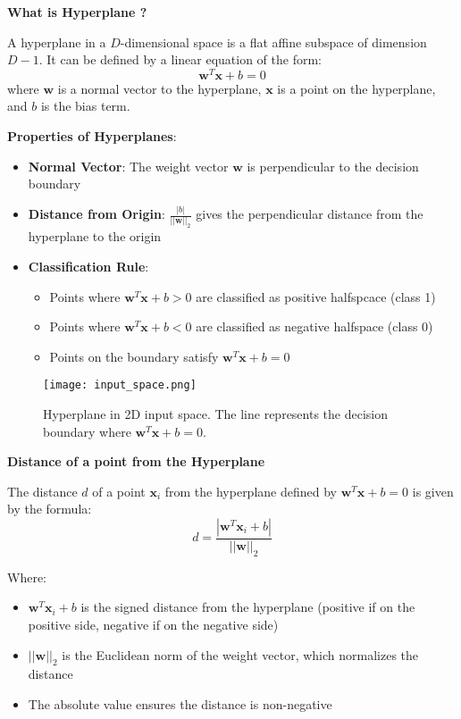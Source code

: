 \textbf{What is Hyperplane ?} 
\begin{definition}[Hyperplane]
A hyperplane in a $D$-dimensional space is a flat affine subspace of dimension $D-1$. It can be defined by a linear equation of the form:
\begin{equation}
\bm{w}^T \bm{x} + b = 0
\end{equation}
where $\bm{w}$ is a normal vector to the hyperplane, $\bm{x}$ is a point on the hyperplane, and $b$ is the bias term.
\end{definition}
\textbf{Properties of Hyperplanes}:
\begin{itemize}
    \item \textbf{Normal Vector}: The weight vector \(\mathbf{w}\) is perpendicular to the decision boundary
    \item \textbf{Distance from Origin}: \(\frac{|b|}{||\mathbf{w}||_2}\) gives the perpendicular distance from the hyperplane to the origin
    \item \textbf{Classification Rule}:
    \begin{itemize}
        \item Points where \(\mathbf{w}^T \mathbf{x} + b > 0\) are classified as positive halfspcace (class 1)
        \item Points where \(\mathbf{w}^T \mathbf{x} + b < 0\) are classified as negative halfspace (class 0)
        \item Points on the boundary satisfy \(\mathbf{w}^T \mathbf{x} + b = 0\)
    \end{itemize}
\end{itemize}
\begin{figure}
    \centering
    \texttt{[image: input\_space.png]}
    \caption{Hyperplane in 2D input space. The line represents the decision boundary where $\bm{w}^T \bm{x} + b = 0$.}
    \label{fig:input_space} 
\end{figure}

\textbf{Distance of a point from the Hyperplane}

The distance \(d\) of a point \(\mathbf{x}_i\) from the hyperplane defined by \(\mathbf{w}^T \mathbf{x} + b = 0\) is given by the formula:
\[
d = \frac{|\mathbf{w}^T \mathbf{x}_i + b|}{||\mathbf{w}||_2}
\]

Where:  
\begin{itemize}
    \item \(\mathbf{w}^T \mathbf{x}_i + b\) is the signed distance from the hyperplane (positive if on the positive side, negative if on the negative side)
    \item \(||\mathbf{w}||_2\) is the Euclidean norm of the weight vector, which normalizes the distance
    \item The absolute value ensures the distance is non-negative
\end{itemize}




